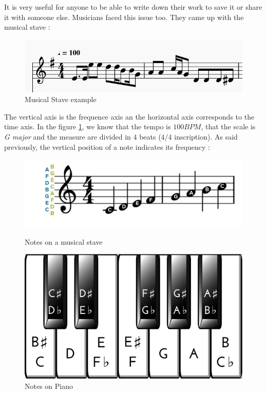\documentclass[12pt]{report}
\begin{document}
It is very useful for anyone to be able to write down their work to save it or share it with someone else. Musicians faced this issue too. They came up with the musical stave :

\begin{figure}[H]
    \centering
    \includegraphics[scale=0.75]{images/music/stave/musical_stave_example.jpg}
    \caption{Musical Stave example}
    \label{fig:musical_stave_example}
\end{figure}

The vertical axis is the frequence axis an the horizontal axis corresponds to the time axis.
In the figure \ref{fig:musical_stave_example}, we know that the tempo is $100 BPM$, that the scale is \textit{G major} and the measure are divided in 4 beats ($4/4$ inscription).
As said previously, the vertical position of a note indicates its frequency :

\begin{figure}[H]
   \begin{minipage}{0.5\textwidth}
     \centering
     \includegraphics[width=.9\linewidth]{images/music/stave/note_names.jpg}
     \caption{Notes on a musical stave}
     \label{fig:note_names}
   \end{minipage}\hfill
   \begin{minipage}{0.5\textwidth}
     \centering
     \includegraphics[width=.9\linewidth]{images/music/piano/piano_keys.png}
     \caption{Notes on Piano}
     \label{fig:piano_keys}
   \end{minipage}
\end{figure}
\end{document}
